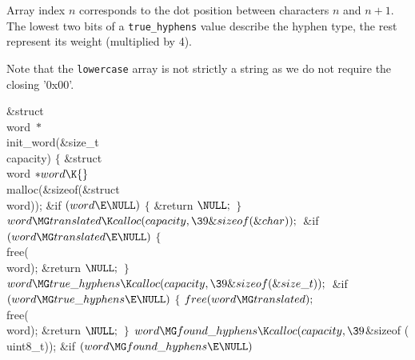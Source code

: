 Array index $n$ corresponds to the dot position between characters $n$ and
$n+1$. The lowest two bits of a
{\tt true\_hyphens} value describe the hyphen type, the rest represent its
weight (multiplied by 4).

Note that the {\tt lowercase} array is not strictly a string as we do not
require the closing '0x00'.

\Y\B\1\1\&{struct} \\{word} ${}{*}{}$\\{init\_word}(\&{size\_t} \\{capacity})\2%
\2\6
${}\{{}$\1\6
\&{struct} \\{word} ${}{*}\\{word}\K{}$\\{malloc}(\&{sizeof}(\&{struct} %
\\{word}));\7
\&{if} ${}(\\{word}\E\NULL){}$\5
${}\{{}$\1\6
\&{return} ${}\NULL;{}$\6
\4${}\}{}$\2\6
${}\\{word}\MG\\{translated}\K\\{calloc}(\\{capacity},\39\&{sizeof}(%
\&{char}));{}$\6
\&{if} ${}(\\{word}\MG\\{translated}\E\NULL){}$\5
${}\{{}$\1\6
\\{free}(\\{word});\6
\&{return} ${}\NULL;{}$\6
\4${}\}{}$\2\6
${}\\{word}\MG\\{true\_hyphens}\K\\{calloc}(\\{capacity},\39\&{sizeof}(\&{size%
\_t}));{}$\6
\&{if} ${}(\\{word}\MG\\{true\_hyphens}\E\NULL){}$\5
${}\{{}$\1\6
${}\\{free}(\\{word}\MG\\{translated});{}$\6
\\{free}(\\{word});\6
\&{return} ${}\NULL;{}$\6
\4${}\}{}$\2\6
${}\\{word}\MG\\{found\_hyphens}\K\\{calloc}(\\{capacity},\39{}$\&{sizeof} (%
\\{uint8\_t}));\6
\&{if} ${}(\\{word}\MG\\{found\_hyphens}\E\NULL){}$\5
